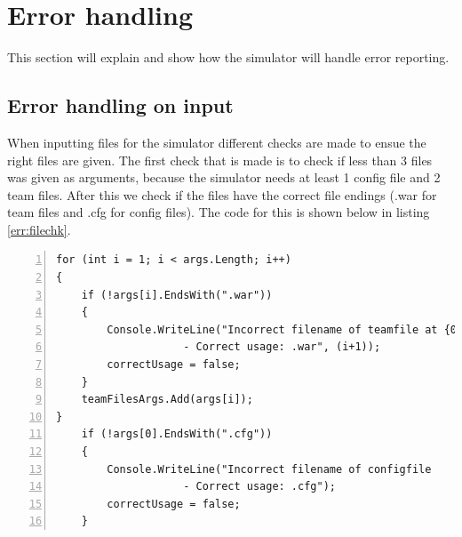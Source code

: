 \section{Error handling}
	This section will explain and show how the simulator will handle error reporting.
	\subsection{Error handling on input}
		When inputting files for the simulator different checks are made to ensue the right files are given. The first check that is made 
		is to check if less than 3 files was given as arguments, because the simulator needs at least 1 config file and 2 team files.
		After this we check if the files have the correct file endings (.war for team files and .cfg for config files). The code for this is 
		shown below in listing \ref{err:filechk}.
		\begin{lstlisting}[basicstyle=\small\sffamily,
			keywords={break,case,const,continue,default,else,enum,
			for,if,return,switch,while,do,long,void,int,float,double,
			char,struct,typedef,include,size\_t},
			keywordstyle={\color{blue}},
			comment={[l]{//}}, morecomment={[s]{/*}{*/}}, commentstyle=\itshape,
			columns={[l]flexible}, numbers=left, numberstyle=\tiny,
			frameround=fftt, frame=shadowbox, captionpos=b,
			caption={Checking of file endings},
			label=err:filechk]
for (int i = 1; i < args.Length; i++)
{
	if (!args[i].EndsWith(".war"))
    {
    	Console.WriteLine("Incorrect filename of teamfile at {0} 
    				- Correct usage: .war", (i+1));
        correctUsage = false;
    }
    teamFilesArgs.Add(args[i]);
}
    if (!args[0].EndsWith(".cfg"))
    {
    	Console.WriteLine("Incorrect filename of configfile 
    				- Correct usage: .cfg");
        correctUsage = false;
    }
		\end{lstlisting}
		
